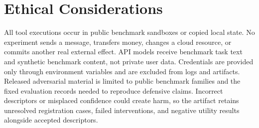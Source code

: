 \section{Ethical Considerations}

All tool executions occur in public benchmark sandboxes or copied local state.
No experiment sends a message, transfers money, changes a cloud resource, or
commits another real external effect.  API models receive benchmark task text
and synthetic benchmark content, not private user data.  Credentials are
provided only through environment variables and are excluded from logs and
artifacts.  Released adversarial material is limited to public benchmark
families and the fixed evaluation records needed to reproduce defensive
claims. Incorrect descriptors or misplaced confidence could create harm, so
the artifact retains unresolved registration cases, failed interventions, and
negative utility results alongside accepted descriptors.
